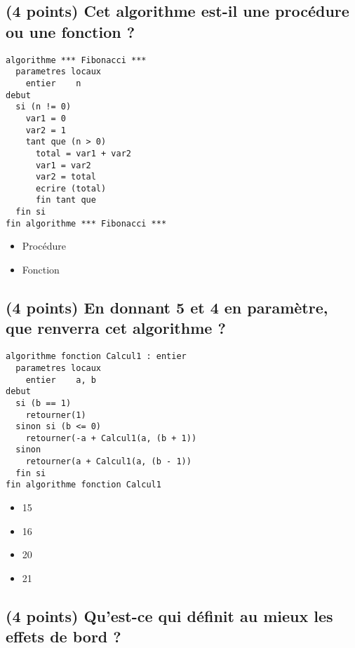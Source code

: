 \documentclass[11pt,a4paper]{article}
\begin{document}
\bigskip


\subsection{(4 points) Cet algorithme est-il une procédure ou une fonction ? }

\begin{lstlisting}[style=algorithmique]
algorithme *** Fibonacci ***
  parametres locaux
    entier    n
debut
  si (n != 0)
    var1 = 0
    var2 = 1
    tant que (n > 0)
      total = var1 + var2
      var1 = var2
      var2 = total
      ecrire (total)
      fin tant que
  fin si
fin algorithme *** Fibonacci ***
\end{lstlisting}

\begin{itemize}
  \item[\CaseCoche] Procédure \\
  \item[\CaseCoche] Fonction \\
\end{itemize}


\bigskip


\subsection{(4 points) En donnant 5 et 4 en paramètre, que renverra cet algorithme ? }

\begin{lstlisting}[style=algorithmique]
algorithme fonction Calcul1 : entier
  parametres locaux
    entier    a, b
debut
  si (b == 1)
    retourner(1)
  sinon si (b <= 0)
    retourner(-a + Calcul1(a, (b + 1))
  sinon
    retourner(a + Calcul1(a, (b - 1))
  fin si
fin algorithme fonction Calcul1
\end{lstlisting}


\begin{itemize}
  \item[\CaseCoche] 15 \\
  \item[\CaseCoche] 16 \\
  \item[\CaseCoche] 20 \\
  \item[\CaseCoche] 21 \\
\end{itemize}


\bigskip


\subsection{(4 points) Qu'est-ce qui définit au mieux les effets de bord ? }
\end{document}
